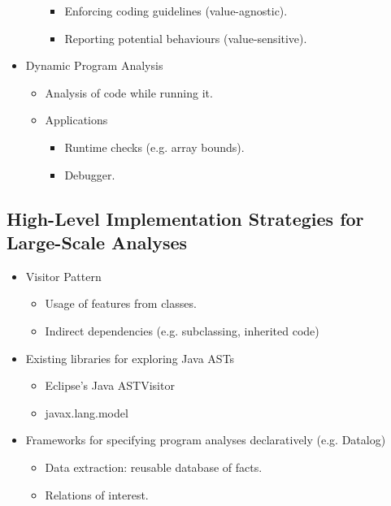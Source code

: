 \documentclass{article}
\begin{document}
\begin{itemize}
\begin{itemize}
        \begin{itemize}
            \item Enforcing coding guidelines (value-agnostic).
            \item Reporting potential behaviours (value-sensitive).
        \end{itemize}
    \end{itemize}
    \item Dynamic Program Analysis
    \begin{itemize}
        \item Analysis of code while running it.
        \item Applications
        \begin{itemize}
            \item Runtime checks (e.g. array bounds).
            \item Debugger.
        \end{itemize}
    \end{itemize}
\end{itemize}

\subsection{High-Level Implementation Strategies for Large-Scale Analyses}

\begin{itemize}
    \item Visitor Pattern
    \begin{itemize}
        \item Usage of features from classes.
        \item Indirect dependencies (e.g. subclassing, inherited code)
    \end{itemize}
    \item Existing libraries for exploring Java ASTs
    \begin{itemize}
        \item Eclipse's Java ASTVisitor
        \item javax.lang.model
    \end{itemize}
    \item Frameworks for specifying program analyses declaratively (e.g. Datalog)
    \begin{itemize}
        \item Data extraction: reusable database of facts.
        \item Relations of interest.
    \end{itemize}
\end{itemize}
\end{document}

